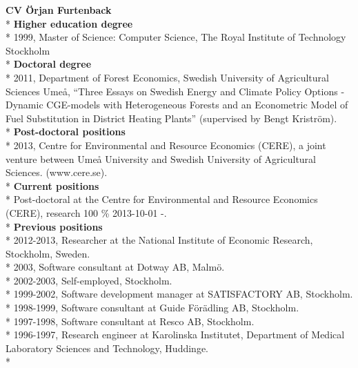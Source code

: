 \documentclass[10pt,a4paper]{article}
\begin{document}
\textbf{CV Örjan Furtenback}\\*
\textbf{Higher education degree}\\*
1999, Master of Science: Computer Science, The Royal Institute of Technology Stockholm\\*
\textbf{Doctoral degree}\\*
2011, Department of Forest Economics, Swedish University of Agricultural Sciences Umeå, “Three Essays on Swedish Energy and Climate Policy Options - 
Dynamic CGE-models with Heterogeneous Forests and an Econometric Model of Fuel
Substitution in District Heating Plants” (supervised by Bengt Kriström).\\*
\textbf{Post-doctoral positions}\\*
2013, Centre for Environmental and Resource Economics (CERE),  a joint venture between Umeå University and Swedish University of Agricultural Sciences. (www.cere.se).\\*
\textbf{Current positions}\\*
Post-doctoral at the Centre for Environmental and Resource Economics (CERE), research 100 \% 2013-10-01 -.\\*
\textbf{Previous positions}\\*
2012-2013, Researcher at the National Institute of Economic Research, Stockholm, Sweden.\\*
2003, Software consultant at Dotway AB, Malmö.\\*
2002-2003, Self-employed, Stockholm.\\*
1999-2002, Software development manager at SATISFACTORY AB, Stockholm.\\*
1998-1999, Software consultant at Guide Förädling AB, Stockholm.\\*
1997-1998, Software consultant at Resco AB, Stockholm.\\*
1996-1997, Research engineer at Karolinska Institutet, Department of Medical Laboratory Sciences and Technology, Huddinge.\\*
\end{document}
